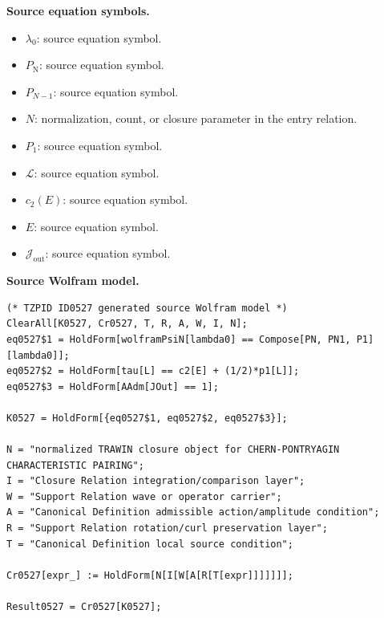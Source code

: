 \begin{minipage}[t]{0.49\linewidth}
\begingroup
\small
\raggedright
\textbf{Source equation symbols.}\par
\begin{itemize}[leftmargin=1.35em,itemsep=1pt,topsep=1pt,parsep=0pt]
    \item $\lambda_0$: source equation symbol.
    \item $P_{\mathrm{N}}$: source equation symbol.
    \item $P_{N-1}$: source equation symbol.
    \item $N$: normalization, count, or closure parameter in the entry relation.
    \item $P_1$: source equation symbol.
    \item $\mathcal{L}$: source equation symbol.
    \item $c_2(E)$: source equation symbol.
    \item $E$: source equation symbol.
    \item $\mathcal{J}_{\mathrm{out}}$: source equation symbol.
\end{itemize}
\endgroup
\end{minipage}\hfill
\begin{minipage}[t]{0.47\linewidth}
\begingroup
\scriptsize
\raggedright
\textbf{Source Wolfram model.}\par
\begin{Verbatim}[fontsize=\tiny,breaklines=true,breakanywhere=true]
(* TZPID ID0527 generated source Wolfram model *)
ClearAll[K0527, Cr0527, T, R, A, W, I, N];
eq0527$1 = HoldForm[wolframPsiN[lambda0] == Compose[PN, PN1, P1][lambda0]];
eq0527$2 = HoldForm[tau[L] == c2[E] + (1/2)*p1[L]];
eq0527$3 = HoldForm[AAdm[JOut] == 1];

K0527 = HoldForm[{eq0527$1, eq0527$2, eq0527$3}];

N = "normalized TRAWIN closure object for CHERN-PONTRYAGIN CHARACTERISTIC PAIRING";
I = "Closure Relation integration/comparison layer";
W = "Support Relation wave or operator carrier";
A = "Canonical Definition admissible action/amplitude condition";
R = "Support Relation rotation/curl preservation layer";
T = "Canonical Definition local source condition";

Cr0527[expr_] := HoldForm[N[I[W[A[R[T[expr]]]]]]];

Result0527 = Cr0527[K0527];
\end{Verbatim}
\endgroup
\end{minipage}

